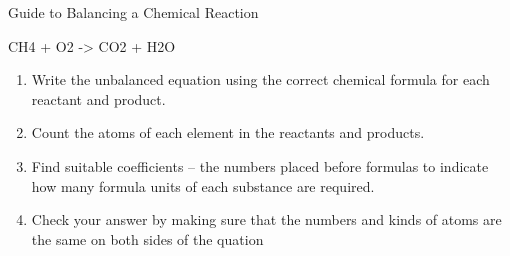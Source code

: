 \documentclass[notes=show]{beamer}
\begin{document}
\begin{frame}[t]{Guide to Balancing a Chemical Reaction}
	\begin{example}
		\begin{reaction*}
			CH4\gas{} + O2\gas{} -> CO2\gas{} + H2O\lqd{}
		\end{reaction*}
	\end{example}

	\begin{enumerate}[<+->]
		\item Write the unbalanced equation using the correct chemical
			formula for each reactant and product.
		\item Count the atoms of each element in the reactants and
			products.
		\item Find suitable \alert{coefficients} -- the numbers placed
			before formulas to indicate how many formula units of
			each substance are required.
		\item Check your answer by making sure that the numbers and
			kinds of atoms are the same on both sides of the quation
	\end{enumerate}

	\bigskip

\end{frame}
\end{document}
